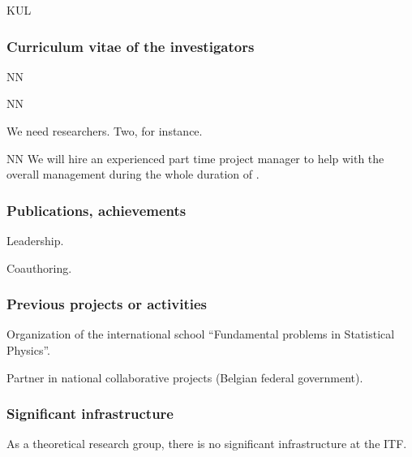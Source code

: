 \begin{sitedescription}{KUL}
\subsubsection*{Curriculum vitae of the investigators}




\begin{participant}[type=res,PM=48,salary=5500]{NN}
\end{participant}
\begin{participant}[type=res,PM=36,salary=5500]{NN}

We need researchers. Two, for instance.

\end{participant}

\begin{participant}[type=res,PM=24,salary=3932]{NN}
  We will hire an experienced part time project manager to help with
  the overall management during the whole duration of \TheProject.
\end{participant}

\subsubsection*{Publications, achievements}

\begin{compactenum}
\item Leadership.
\item Coauthoring.
\end{compactenum}


\subsubsection*{Previous projects or activities}

\begin{compactenum}
\item Organization of the international school ``Fundamental problems in
  Statistical Physics''.
\item Partner in national collaborative projects (Belgian federal government).
\end{compactenum}

\subsubsection*{Significant infrastructure}

As a theoretical research group, there is no significant infrastructure at the ITF.

\end{sitedescription}



